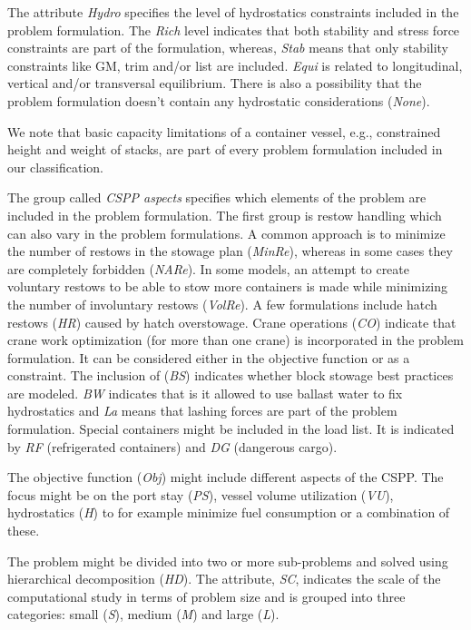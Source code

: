 \documentclass[preprint,12pt,authoryear]{elsarticle}
\begin{document}
The attribute \textit{Hydro} specifies the level of hydrostatics constraints included in the problem formulation. The \textit{Rich} level indicates that both stability and stress force constraints are part of the formulation, whereas, \textit{Stab} means that only stability constraints like GM, trim and/or list are included. \textit{Equi} is related to longitudinal, vertical and/or transversal equilibrium. There is also a possibility that the problem formulation doesn't contain any hydrostatic considerations (\textit{None}).

We note that basic capacity limitations of a container vessel, e.g., constrained height and weight of stacks, are part of every problem formulation included in our classification.

The group called \textit{CSPP aspects} specifies which elements of the problem are included in the problem formulation. The first group is restow handling which can also vary in the problem formulations. A common approach is to minimize the number of restows in the stowage plan (\textit{MinRe}), whereas in some cases they are completely forbidden (\textit{NARe}). In some models, an attempt to create voluntary restows to be able to stow more containers is made while minimizing the number of involuntary restows (\textit{VolRe}). A few formulations include hatch restows (\textit{HR}) caused by hatch overstowage. Crane operations (\textit{CO}) indicate that crane work optimization (for more than one crane) is incorporated in the problem formulation. It can be considered either in the objective function or as a constraint. The inclusion of (\textit{BS}) indicates whether block stowage best practices are modeled. \textit{BW} indicates that is it allowed to use ballast water to fix hydrostatics and \textit{La} means that lashing forces are part of the problem formulation. Special containers might be included in the load list. It is indicated by \textit{RF} (refrigerated containers) and \textit{DG} (dangerous cargo).

The objective function (\textit{Obj}) might include different aspects of the CSPP. The focus might be on the port stay (\textit{PS}), vessel volume utilization (\textit{VU}), hydrostatics (\textit{H}) to for example minimize fuel consumption or a combination of these.

The problem might be divided into two or more sub-problems and solved using hierarchical decomposition (\textit{HD}). The attribute, \textit{SC}, indicates the scale of the computational study in terms of problem size and is grouped into three categories: small (\textit{S}), medium (\textit{M}) and large (\textit{L}). 
\end{document}
